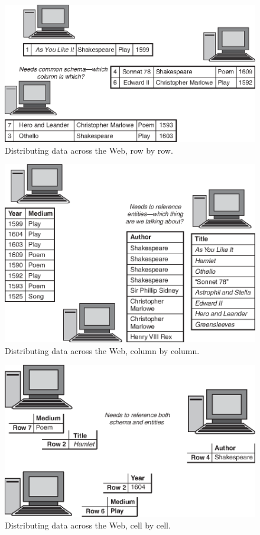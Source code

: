 \begin{figure}
    \centering
    \includegraphics[width=5.0in]{media/f03-01-9780123859655.eps}
    \caption{Distributing data across the Web, row by row.}
    \label{fig:ch3.1}
\end{figure}



\begin{figure}
    \centering
    \includegraphics[width=5.0in]{media/f03-02-9780123859655.eps}
    \caption{Distributing data across the Web, column by column.}
    \label{fig:ch3.2}
\end{figure}



\begin{figure}
    \centering
    \includegraphics[width=5.0in]{media/f03-03-9780123859655.eps}
    \caption{Distributing data across the Web, cell by cell.}
    \label{fig:ch3.3}
\end{figure}



